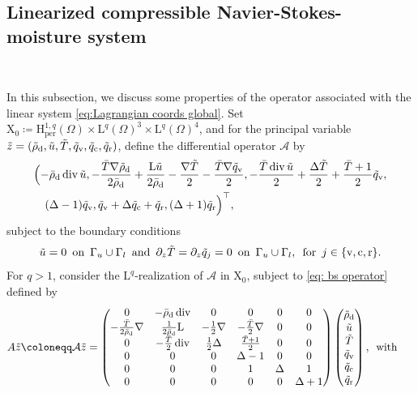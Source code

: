 \documentclass[10pt]{amsart}
\theoremstyle{plain}
\theoremstyle{definition}
\theoremstyle{thm}
\numberwithin{equation}{section}
\newcommand{\rL}{\mathrm{L}}
\newcommand{\rLq}{\rL^q}
\newcommand{\rH}{\mathrm{H}}
\newcommand{\rX}{\mathrm{X}}
\newcommand{\cA}{\mathcal{A}}
\DeclareMathOperator{\mdiv}{div}
\newcommand{\del}{\partial}
\newcommand{\per}{\mathrm{per}}
\newcommand{\dz}{\del_z}
\newcommand{\Gal}{\Gamma_l}
\newcommand{\Gau}{\Gamma_u}
\newcommand{\tand}{\enspace \text{and} \enspace}
\newcommand{\ton}{\enspace \text{on} \enspace}
\newcommand{\tfor}{\enspace \text{for} \enspace}
\newcommand{\twith}{\enspace \text{with} \enspace}
\newcommand{\rd}{\mathrm{d}}
\newcommand{\rr}{\mathrm{r}}
\newcommand{\rv}{\mathrm{v}}
\newcommand{\rc}{\mathrm{c}}
\newcommand{\trho}{\Tilde{\rho}}
\newcommand{\tu}{\Tilde{u}}
\newcommand{\tz}{\Tilde{z}}
\newcommand{\tT}{\Tilde{T}}
\newcommand{\tq}{\Tilde{q}}
\begin{document}
\subsection{Linearized compressible Navier-Stokes-moisture system}\label{subsec:lin NS M}
\ 

In this subsection, we discuss some properties of the operator associated with the linear system \eqref{eq:Lagrangian coords global}. 
Set $\rX_0 \coloneqq \rH^{1,q}_\per(\Omega) \times \rLq(\Omega)^3 \times \rLq(\Omega)^4$, and for the principal variable $\tz = (\trho_\rd, \tu, \tT,\tq_\rv,\tq_\rc, \tq_\rr)$, define the differential operator $\cA$ by 
\begin{equation*}
    \begin{aligned}
        &\Bigl( -\bar{\rho}_\rd \mdiv \tu ,- \frac{\bar{T}\nabla  \trho_\rd }{2 \bar{\rho}_\rd} + \frac{\rL \tu}{2\bar{\rho}_\rd } - \frac{\nabla \tT}{2} - \frac{\bar{T}\nabla \tq_\rv}{2},- \frac{\bar{T}\mdiv \tu}{2} + \frac{\Delta \tT }{2}  +\frac{\bar{T}+1}{2}\tq_\rv,\\
        &\quad (\Delta -1)\tq_\rv,\tq_\rv + \Delta \tq_\rc + \tq_\rr, (\Delta +1) \tq_\rr \Bigr)^\top,
    \end{aligned}
\end{equation*}
subject to the boundary conditions 
\begin{equation}\label{eq: bs operator}
    \tu = 0 \ton \Gau \cup \Gal \tand \dz \tT= \dz \tq_j =0 \ton \Gau \cup \Gal, \tfor j \in \{ \rv,\rc,\rr \}.
\end{equation}
For $q>1$, consider the $\rLq$-realization of $\cA$ in $\rX_0$, subject to \eqref{eq: bs operator} defined by 
\begin{equation*}
\begin{aligned}
    A \tz &\coloneqq \cA \tz = \begin{pmatrix}
        0 & -\bar{\rho}_\rd \mdiv & 0 & 0 & 0 & 0 \\
       - \frac{\bar{T}}{2 \bar{\rho}_\rd} \nabla & \frac{1}{2 \bar{\rho}_\rd}\rL & -\frac{1}{2} \nabla & -\frac{\bar{T}}{2} \nabla & 0 & 0 \\ 0 & -\frac{\bar{T}}{2} \mdiv & \frac{1}{2}\Delta & \frac{ \bar{T}+1 }{2}& 0 & 0 \\ 0 & 0 & 0 & \Delta -1 & 0 & 0 \\ 0 & 0 & 0 & 1  & \Delta & 1 \\ 
       0 & 0 & 0 & 0 & 0& \Delta+1  
    \end{pmatrix} \begin{pmatrix}
        \trho_\rd \\ \tu \\ \tT \\ \tq_\rv \\ \tq_\rc \\ \tq_\rr 
    \end{pmatrix}, \twith
\end{aligned}
\end{equation*}
\end{document}
